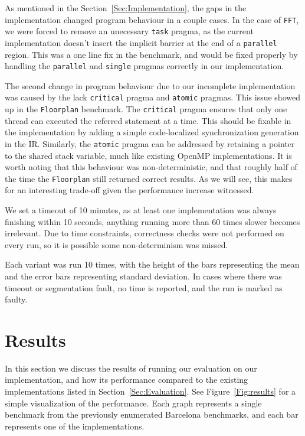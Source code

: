 \documentclass[sigconf]{acmart}
\begin{document}
As mentioned in the Section~\ref{Sec:Implementation}, the gaps in the implementation
changed program behaviour in a couple cases. In the case of \texttt{FFT}, we were
forced to remove an unecessary \texttt{task} pragma, as the current implementation
doesn't insert the implicit barrier at the end of a \texttt{parallel} region. This 
was a one line fix in the benchmark, and would be fixed properly by handling
the \texttt{parallel} and \texttt{single} pragmas correctly in our implementation. 

The second change in program behaviour due to our incomplete implementation was
caused by the lack \texttt{critical} pragma and \texttt{atomic} pragmas. This
issue showed up in the \texttt{Floorplan} benchmark. The \texttt{critical} pragma
ensures that only one thread can executed the referred statement at a time. 
This should be fixable in the implementation by adding a simple code-localized
synchronization generation in the IR. Similarly, the \texttt{atomic} pragma 
can be addressed by retaining a pointer to the shared stack variable, much like
existing OpenMP implementations. It is worth noting that this behaviour was
non-deterministic, and that roughly half of the time the \texttt{Floorplan}
still returned correct results. As we will see, this makes for an interesting
trade-off given the performance increase witnessed.

We set a timeout of 10 minutes, as at least one implementation was always
finishing within 10 seconds, anything running more than 60 times slower becomes
irrelevant. Due to time constraints, correctness checks were not performed on
every run, so it is possible some non-determinism was missed. 

Each variant was run 10 times, with the height of the bars representing the
mean and the error bars representing standard deviation. In cases where there
was timeout or segmentation fault, no time is reported, and the run is marked
as faulty. 

\section{Results} \label{Sec:Results}

In this section we discuss the results of running our evaluation on our
implementation, and how its performance compared to the existing
implementations listed in Section~\ref{Sec:Evaluation}. See
Figure~\ref{Fig:results} for a simple visualization of the performance. Each
graph represents a single benchmark from the previously enumerated Barcelona
benchmarks, and each bar represents one of the implementations. 
\end{document}
